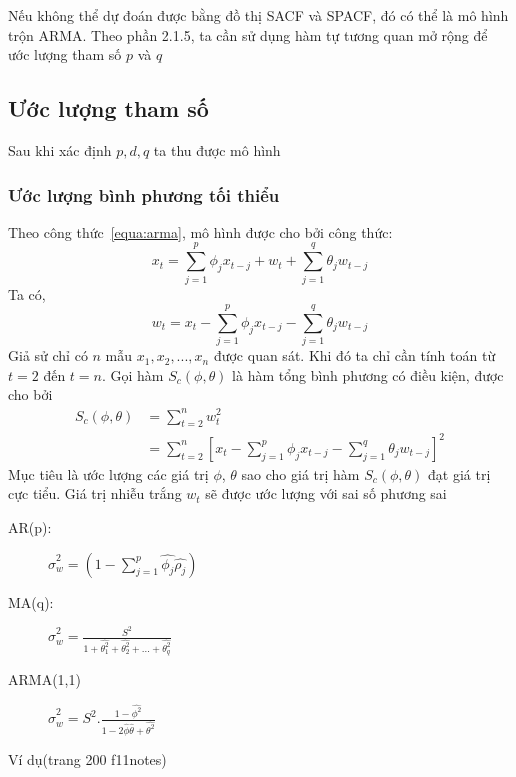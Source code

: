\documentclass[twoside,12pt]{Latex/Classes/PhDthesisPSnPDF}
\begin{document}
Nếu không thể dự đoán được bằng đồ thị SACF và SPACF, đó có thể là mô hình trộn ARMA. Theo phần 2.1.5, ta cần sử dụng hàm tự tương quan mở rộng để ước lượng tham số $p$ và $q$

\subsection{Ước lượng tham số}
Sau khi xác định $p,d,q$ ta thu được mô hình 
\subsubsection{Ước lượng bình phương tối thiểu}
Theo công thức~\ref{equa:arma}, mô hình được cho bởi công thức:
\begin{equation}
x_t = \sum\limits_{j=1}^{p}\phi_jx_{t-j}+w_t+\sum\limits_{j=1}^{q}\theta_jw_{t-j}
\end{equation}
Ta có,\begin{equation}\label{cls_wt}
	w_t = x_t - \sum\limits_{j=1}^{p}\phi_jx_{t-j}- \sum\limits_{j=1}^{q}\theta_jw_{t-j}
\end{equation}
Giả sử chỉ có $n$ mẫu $x_1,x_2,...,x_n$ được quan sát. Khi đó ta chỉ cần tính toán từ $t=2$ đến $t=n$. Gọi hàm $S_c(\phi,\theta)$ là hàm tổng bình phương có điều kiện, được cho bởi
\begin{align}
	S_c(\phi,\theta) &= \sum\limits_{t=2}^{n}w_t^{2} \\
					&=	\sum\limits_{t=2}^{n}[x_t - \sum\limits_{j=1}^{p}\phi_jx_{t-j}- \sum\limits_{j=1}^{q}\theta_jw_{t-j}]^{2}
					\end{align}
Mục tiêu là ước lượng các giá trị $\phi$, $\theta$ sao cho giá trị hàm $S_c(\phi,\theta)$ đạt giá trị cực tiểu.
Giá trị nhiễu trắng $w_t$ sẽ được ước lượng với sai số phương sai
\begin{description}
\item[AR(p):]\qquad\qquad $\hat{\sigma}_w^{2} = (1-\sum\limits^{p}_{j=1}\hat{\phi_j}\hat{\rho_j})$

\item [MA(q):]\qquad\qquad $\hat{\sigma}_w^{2} =\frac{S^2}{1+\hat{\theta_1^2}+\hat{\theta_2^2}+\dots+\hat{\theta_q^2}}$
\item[ARMA(1,1)]\qquad $\hat{\sigma}_w^{2} = S^2.\frac{1-\hat{\phi^2}}{1-2\hat{\phi}\hat{\theta}+\hat{\theta^2}}$
\end{description}
Ví dụ(trang 200 f11notes)
\end{document}
